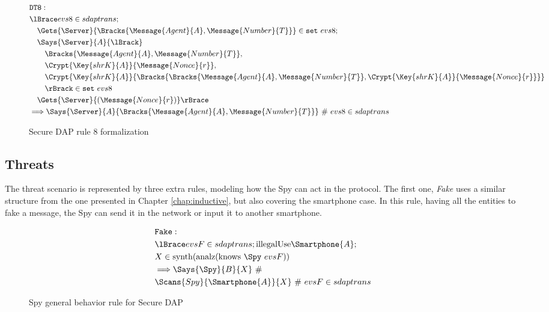 \begin{figure}[!h]
  \begin{align*}
    & \texttt{DT8}: \newline \\
    & \lBrace evs8 \in sdaptrans; \\
    & \quad \Gets{\Server}{\Bracks{\Message{Agent}{A}, \Message{Number}{T}}} \in \texttt{set} \ evs8; \\
    & \quad \Says{\Server}{A}{\lBrack} \\
    & \qquad \Bracks{\Message{Agent}{A}, \Message{Number}{T}}, \\
    & \qquad \Crypt{\Key{shrK}{A}}{\Message{Nonce}{r}}, \\
    & \qquad \Crypt{\Key{shrK}{A}}{\Bracks{\Bracks{\Message{Agent}{A}, \Message{Number}{T}}, \Crypt{\Key{shrK}{A}}{\Message{Nonce}{r}}}} \\
    & \qquad \rBrack \in \texttt{set} \ evs8 \\
    & \quad \Gets{\Server}{(\Message{Nonce}{r})} \rBrace \\
    & \Longrightarrow \Says{\Server}{A}{\Bracks{\Message{Agent}{A}, \Message{Number}{T}}} \ \# \ evs8 \in sdaptrans
  \end{align*}
  \label{fig:dap-model-8}
  \caption{Secure DAP rule 8 formalization}
\end{figure}

\subsection{Threats}
The threat scenario is represented by three extra rules, modeling how the Spy can act in the protocol. The first one, \textit{Fake} uses a similar structure from the one presented in Chapter \ref{chap:inductive}, but also covering the smartphone case. In this rule, having all the entities to fake a message, the Spy can send it in the network or input it to another smartphone.

\begin{figure}[!h]
  \begin{align*}
    & \texttt{Fake}: \newline \\
    & \lBrace evsF \in sdaptrans; \text{illegalUse} \Smartphone{A}; \\
    & X \in \text{synth}(\text{analz}(\text{knows} \ \Spy \ evsF)) \\
    & \Longrightarrow \Says{\Spy}{B}{X}\ \# \\ 
    & \Scans{Spy}{\Smartphone{A}}{X} \ \# \ evsF \in sdaptrans
  \end{align*}
  \label{fig:dap-model-threat-1}
  \caption{Spy general behavior rule for Secure DAP}
\end{figure}


